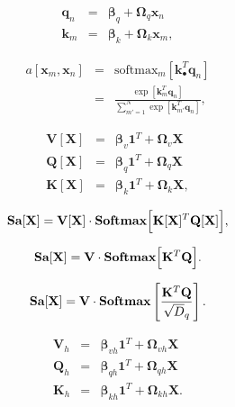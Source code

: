 \documentclass[letterpaper,twoside,openany, titlepage,oldfontcommands,titles,dvipsnames]{memoir}
\begin{document}
\begin{eqnarray}
  \mathbf{q}_{n} &=& \boldsymbol\beta_{q}+\boldsymbol\Omega_{q}\mathbf{x}_{n}\nonumber \\
  \mathbf{k}_{m} &=& \boldsymbol\beta_{k}+\boldsymbol\Omega_{k}\mathbf{x}_{m},
 \end{eqnarray}

\begin{eqnarray}\label{eq:transformer_sattention2}
  a[\mathbf{x}_{m},\mathbf{x}_{n}] &=& \mbox{softmax}_{m}\left[\mathbf{k}_{\bullet}^{T}\mathbf{q}_{n}\right]\nonumber\\
  &=& \frac{\exp\left[\mathbf{k}_{m}^{T}\mathbf{q}_{n}\right]}{\sum_{m'=1}^{N}\exp\left[\mathbf{k}_{m'}^{T}\mathbf{q}_{n} \right]},
 \end{eqnarray}

\begin{eqnarray}
 \mathbf{V}[\mathbf{X}] &=& \boldsymbol\beta_{v}\mathbf{1}^{T}+\boldsymbol\Omega_{\textit{v}}\mathbf{X}\nonumber \\
 \mathbf{Q}[\mathbf{X}] &=& \boldsymbol\beta_{q}\mathbf{1}^{T}+\boldsymbol\Omega_{\textit{q}}\mathbf{X}\nonumber \\
 \mathbf{K}[\mathbf{X}] &=& \boldsymbol\beta_{k}\mathbf{1}^{T}+\boldsymbol\Omega_{\textit{k}}\mathbf{X},
 \end{eqnarray}

\begin{eqnarray}
  \mbox{{\bf Sa}}[\mathbf{X}] =\mathbf{V}[\mathbf{X}]\cdot\mbox{\bf Softmax}\Bigl[\mathbf{K}[\mathbf{X}]^{T}\mathbf{Q}[\mathbf{X}]\Bigr],
 \end{eqnarray}

\begin{eqnarray}\label{eq:transformer_sa_matrix}
  \mbox{{\bf Sa}}[\mathbf{X}] =\mathbf{V}\cdot\mbox{\bf Softmax}\Bigl[\mathbf{K}^{T}\mathbf{Q}\Bigr].
 \end{eqnarray}

\begin{eqnarray}
  \mbox{{\bf Sa}}[\mathbf{X}] =\mathbf{V}\cdot\mbox{\bf Softmax}\left[\frac{\mathbf{K}^{T}\mathbf{Q}}{\sqrt{D}_{q}}\right].
 \end{eqnarray}

\begin{eqnarray}
 \mathbf{V}_h &=& \boldsymbol\beta_{vh}\mathbf{1}^{T}+\boldsymbol\Omega_{\mathit{vh}}\mathbf{X}\nonumber \\
 \mathbf{Q}_h &=& \boldsymbol\beta_{qh}\mathbf{1}^{T}+\boldsymbol\Omega_{\mathit{qh}}\mathbf{X}\nonumber \\
 \mathbf{K}_h &=& \boldsymbol\beta_{kh}\mathbf{1}^{T}+\boldsymbol\Omega_{\mathit{kh}}\mathbf{X}.
 \end{eqnarray}
\end{document}
